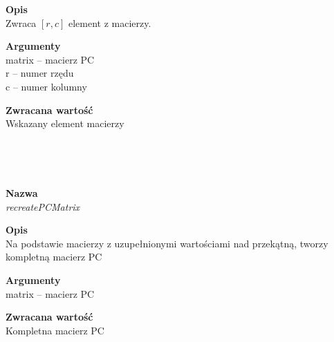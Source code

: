 \begin{spacing}{1.1}
\begin{spacing}{1.1}
\begin{spacing}{1.1}
\begin{spacing}{1.2}
\begin{spacing}{1.1}
\begin{spacing}{1.2}
\begin{spacing}{1.2}
\begin{spacing}{1.2}
\begin{spacing}{1.2}
\begin{spacing}{1.2}
\begin{spacing}{1.2}
\begin{spacing}{1.2}
\textbf{Opis}\\ Zwraca $[r,c]$ element z macierzy.\\  \begin{spacing}{0.3}  \end{spacing}
 
\textbf{Argumenty} \\
matrix -- macierz PC \\ 
r -- numer rzędu \\
c -- numer kolumny \\ \begin{spacing}{0.3}  \end{spacing}

\textbf{Zwracana wartość}\\ Wskazany element macierzy \\ \begin{spacing}{0.3}  \end{spacing}\\


\newpage
\begin{spacing}{1.2}
 \\ \begin{spacing}{0.5}  \end{spacing}

\textbf{Nazwa}\\  \emph{recreatePCMatrix} \\ \begin{spacing}{0.3}  \end{spacing}
 
\textbf{Opis}\\ Na podstawie macierzy z uzupełnionymi wartościami nad przekątną, tworzy kompletną macierz PC \\  \begin{spacing}{0.3}  \end{spacing}
 
\textbf{Argumenty} \\
matrix -- macierz PC \\  \begin{spacing}{0.3}  \end{spacing}

\textbf{Zwracana wartość}\\ Kompletna macierz PC \\ \begin{spacing}{0.3}  \end{spacing}\\





\end{spacing}
\end{spacing}
\end{spacing}
\end{spacing}
\end{spacing}
\end{spacing}
\end{spacing}
\end{spacing}
\end{spacing}
\end{spacing}
\end{spacing}
\end{spacing}
\end{spacing}
